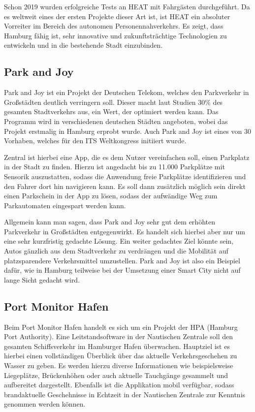 Schon 2019 wurden erfolgreiche Tests an HEAT mit Fahrgästen durchgeführt.
Da es weltweit eines der ersten Projekte dieser Art ist, ist HEAT ein absoluter Vorreiter im Bereich des autonomen Personennahverkehrs.
Es zeigt, dass Hamburg fähig ist, sehr innovative und zukunftsträchtige Technologien zu entwickeln und in die bestehende Stadt einzubinden.

\subsection{Park and Joy}

Park and Joy ist ein Projekt der Deutschen Telekom, welches den Parkverkehr in Großstädten deutlich verringern soll. Dieser macht laut Studien 30\% des gesamten Stadtverkehrs aus, ein Wert, der optimiert werden kann. Das Programm wird in verschiedenen deutschen Städten angeboten, wobei das Projekt erstmalig in Hamburg erprobt wurde. Auch Park and Joy ist eines von 30 Vorhaben, welches für den ITS Weltkongress initiiert wurde. \autocite[vgl.][]{SmartCityKompass.2020a}

Zentral ist hierbei eine App, die es dem Nutzer vereinfachen soll, einen Parkplatz in der Stadt zu finden. Hierzu ist angedacht bis zu 11.000 Parkplätze mit Sensorik auszustatten, sodass die Anwendung freie Parkplätze identifizieren und den Fahrer dort hin navigieren kann. Es soll dann zusätzlich möglich sein direkt einen Parkschein in der App zu lösen, sodass der aufwändige Weg zum Parkautomaten eingespart werden kann. \autocite[vgl.][]{ParkandJoy.2020}

Allgemein kann man sagen, dass Park and Joy sehr gut dem erhöhten Parkverkehr in Großstädten entgegenwirkt. Es handelt sich hierbei aber nur um eine sehr kurzfristig gedachte Lösung. Ein weiter gedachtes Ziel könnte sein, Autos gänzlich aus dem Stadtverkehr zu verdrängen und die Mobilität auf platzsparendere Verkehrsmittel umzustellen. Park and Joy ist also ein Beispiel dafür, wie in Hamburg teilweise bei der Umsetzung einer Smart City nicht auf lange Sicht gedacht wird.

\subsection{Port Monitor Hafen}

Beim Port Monitor Hafen handelt es sich um ein Projekt der HPA (Hamburg Port Authority).
Eine Leitstandsoftware in der Nautischen Zentrale soll den gesamten Schiffsverkehr im Hamburger Hafen überwachen. Hauptziel ist es hierbei einen vollständigen Überblick über das aktuelle Verkehrsgeschehen zu Wasser zu geben.
Es werden hierzu diverse Informationen wie beispielsweise Liegeplätze, Brückenhöhen oder auch aktuelle Tauchgänge gesammelt und aufbereitet dargestellt.
Ebenfalls ist die Applikation mobil verfügbar, sodass brandaktuelle Geschehnisse in Echtzeit in der Nautischen Zentrale zur Kenntnis genommen werden können. \autocite[vgl.][]{SmartCityKompass.2020b}


